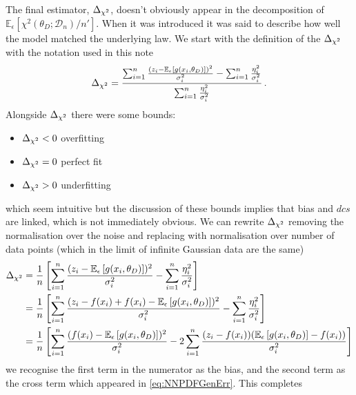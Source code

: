 The final estimator, $\Delta_{\chi^{2}}$, doesn't obviously appear in the decomposition of \newline
$\mathbb{E}_{\epsilon}\left[\chi^2(\theta_D; \mathcal{D}_{n})/n'\right]$.
When it was introduced it was said to describe how well the model matched the
underlying law. We start with the definition of the $\Delta_{\chi^{2}}$ with the notation
used in this note
%
\begin{equation}
        \Delta_{\chi^{2}} = \frac{
            \sum_{i=1}^{n} \frac{(z_i -
            \mathbb{E}_{\epsilon}\left[g(x_i,\theta_D)\right])^2}{\sigma_i^2} -
            \sum_{i=1}^n \frac{\eta_i^2}{\sigma_i^2}}{
                \sum_{i=1}^n \frac{\eta_i^2}{\sigma_i^2}} \, .
\end{equation}
Alongside $\Delta_{\chi^{2}}$ there were some bounds:
%
\begin{itemize}
    \item $\Delta_{\chi^{2}} < 0$ overfitting
    \item $\Delta_{\chi^{2}} = 0$ perfect fit
    \item $\Delta_{\chi^{2}} > 0$ underfitting
\end{itemize}
%
which seem intuitive but the discussion of these bounds implies that bias and
$dcs$ are linked, which is not immediately obvious. We can rewrite
$\Delta_{\chi^{2}}$ removing the normalisation over the noise and replacing with normalisation
over number of data points (which in the limit of infinite Gaussian data are
the same)
%
\begin{equation}
    \begin{split}
        \Delta_{\chi^{2}} &= \frac{1}{n}\left[ \sum_{i=1}^{n} \frac{(z_i -
        \mathbb{E}_{\epsilon}\left[g(x_i,\theta_D)\right])^2}{\sigma_i^2} -
        \sum_{i=1}^n \frac{\eta_i^2}{\sigma_i^2} \right] \\
        &= \frac{1}{n}\left[ \sum_{i=1}^{n} \frac{(z_i - f(x_i) + f(x_i) -
        \mathbb{E}_{\epsilon}\left[g(x_i,\theta_D)\right])^2}{\sigma_i^2} -
        \sum_{i=1}^n \frac{\eta_i^2}{\sigma_i^2} \right] \\
        &= \frac{1}{n} \left[ \sum_{i=1}^{n} \frac{(f(x_i) -
        \mathbb{E}_{\epsilon}\left[g(x_i,\theta_D)\right])^2}{\sigma_i^2} -
        2\sum_{i=1}^n \frac{
            (z_i - f(x_i))(\mathbb{E}_{\epsilon}\left[g(x_i,\theta_D)\right] - f(x_i))}{
                \sigma_i^2}\right]
    \end{split}
    \label{eq: deltachi2tobias}
\end{equation}
%
we recognise the first term in the numerator as the bias, and the second term
as the cross term which appeared in \eqref{eq:NNPDFGenErr}. This completes
